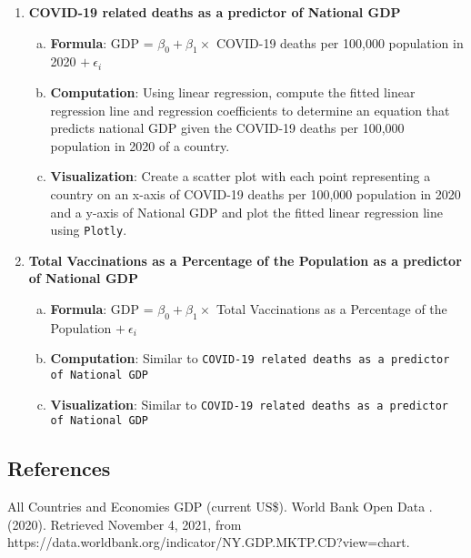 \documentclass[fontsize=11pt]{article}
\begin{document}
\begin{enumerate}
        \newpage

        \item \textbf{COVID-19 related deaths as a predictor of National GDP}
            \begin{enumerate}[(a)]
                \item \textbf{Formula}: GDP = $\beta_{0} + \beta_{1} \times$ COVID-19 deaths per 100,000 population in 2020 $+ \  \epsilon_{i}$
                \item \textbf{Computation}: Using linear regression, compute the fitted linear regression line and regression coefficients to determine an equation that predicts national GDP given the COVID-19 deaths per 100,000 population in 2020 of a country.
                \item \textbf{Visualization}: Create a scatter plot with each point representing a country on an x-axis of COVID-19 deaths per 100,000 population in 2020 and a y-axis of National GDP and plot the fitted linear regression line using \texttt{Plotly}.
            \end{enumerate}
        \item \textbf{Total Vaccinations as a Percentage of the Population as a predictor of National GDP}
            \begin{enumerate}[(a)]
                \item \textbf{Formula}: GDP = $\beta_{0} + \beta_{1} \times$ Total Vaccinations as a Percentage of the Population $+ \ \epsilon_{i}$
                \item \textbf{Computation}: Similar to \texttt{COVID-19 related deaths as a predictor of National GDP}
                \item \textbf{Visualization}: Similar to \texttt{COVID-19 related deaths as a predictor of National GDP}
            \end{enumerate}
    \end{enumerate}

\newpage
\begin{center}
\section*{References}
\end{center}

    \item All Countries and Economies GDP (current US\$). World Bank Open Data . (2020). Retrieved November 4, 2021, \indent from https://data.worldbank.org/indicator/NY.GDP.MKTP.CD?view=chart.  \\
\end{document}
